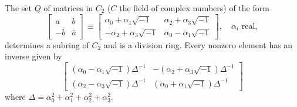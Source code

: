 The set $Q$ of matrices in $C_2$ ($C$ the field of complex numbers) of the form
$$\begin{bmatrix}
a & b \\
-\bar{b} & \bar{a}
\end{bmatrix} \equiv \begin{bmatrix}
\alpha_0 + \alpha_1\sqrt{-1} & \alpha_2 + \alpha_3\sqrt{-1} \\
-\alpha_2 + \alpha_3\sqrt{-1} & \alpha_0 - \alpha_1\sqrt{-1}
\end{bmatrix}, \quad \alpha_i \text{ real},$$
determines a subring of $C_2$ and is a division ring. Every nonzero element has an inverse given by
$$\begin{bmatrix}
(\alpha_0 - \alpha_1\sqrt{-1})\Delta^{-1} & -(\alpha_2 + \alpha_3\sqrt{-1})\Delta^{-1} \\
(\alpha_2 - \alpha_3\sqrt{-1})\Delta^{-1} & (\alpha_0 + \alpha_1\sqrt{-1})\Delta^{-1}
\end{bmatrix}$$
where $\Delta = \alpha_0^2 + \alpha_1^2 + \alpha_2^2 + \alpha_3^2$.
